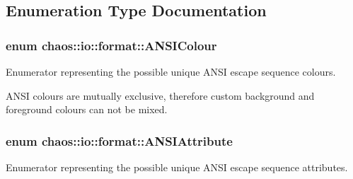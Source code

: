 \subsection{Enumeration Type Documentation}
\hypertarget{namespacechaos_1_1io_1_1format_aa30dcff2478ffc94e33504c8886a5b1a}{
\subsubsection[{A\-N\-S\-I\-Colour}]{\setlength{\rightskip}{0pt plus 5cm}enum {\bf chaos\-::io\-::format\-::\-A\-N\-S\-I\-Colour}}}\label{namespacechaos_1_1io_1_1format_aa30dcff2478ffc94e33504c8886a5b1a}


Enumerator representing the possible unique A\-N\-S\-I escape sequence colours. 

A\-N\-S\-I colours are mutually exclusive, therefore custom background and foreground colours can not be mixed. \hypertarget{namespacechaos_1_1io_1_1format_af01119682ec0bc616b49641e0c2a7ccf}{
\subsubsection[{A\-N\-S\-I\-Attribute}]{\setlength{\rightskip}{0pt plus 5cm}enum {\bf chaos\-::io\-::format\-::\-A\-N\-S\-I\-Attribute}}}\label{namespacechaos_1_1io_1_1format_af01119682ec0bc616b49641e0c2a7ccf}


Enumerator representing the possible unique A\-N\-S\-I escape sequence attributes. 

